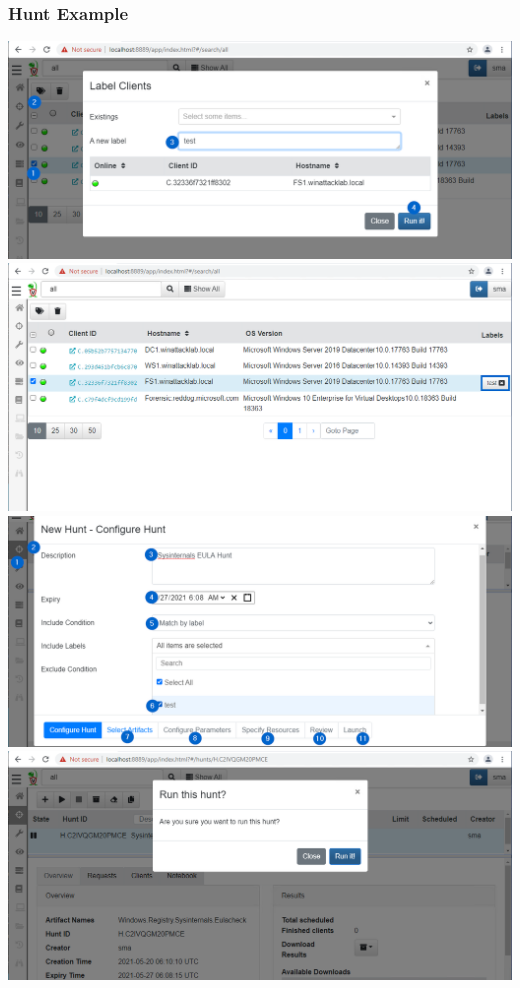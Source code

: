 \subsubsection*{Hunt Example}
\includegraphics[width=\textwidth]{resources/06-velociraptor-hunt-2.png}
\includegraphics[width=\textwidth]{resources/06-velociraptor-hunt-3.png}
\includegraphics[width=\textwidth]{resources/06-velociraptor-hunt-4.png}
\includegraphics[width=\textwidth]{resources/06-velociraptor-hunt-5.png}

